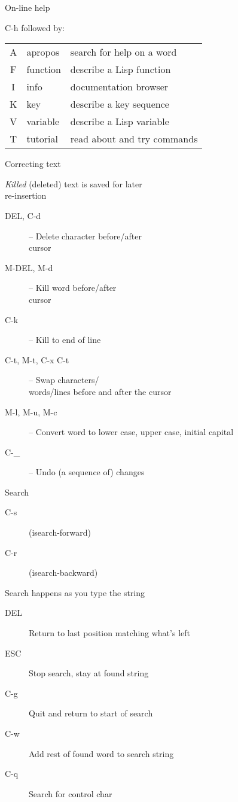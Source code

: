 \begin{slide}{}
On-line help

\vspace{3cm}

C-h followed by:

\begin{tabular}{cll}
A & apropos  & search for help on a word \\
F & function & describe a Lisp function \\
I & info     & documentation browser \\
K & key      & describe a key sequence \\
V & variable & describe a Lisp variable \\
T & tutorial & read about and try commands
\end{tabular}
\end{slide}

\begin{slide}{}
Correcting text

{\em Killed} (deleted) text is saved for later \\
re-insertion

\begin{description}
\item[DEL, C-d]
-- Delete character before/after \\
cursor
\item[M-DEL, M-d]
-- Kill word before/after \\
cursor
\item[C-k]
-- Kill to end of line

\item[C-t, M-t, C-x C-t]
-- Swap characters/ \\
words/lines before and after the cursor

\item[M-l, M-u, M-c]
-- Convert word to lower case, upper case, initial capital

\item[C-\_]
-- Undo (a sequence of) changes
\end{description}
\end{slide}

\begin{slide}{}
Search
\begin{description}
\item[C-s]
(isearch-forward)
\item[C-r]
(isearch-backward)
\end{description}
Search happens as you type the string

\begin{description}
\item[DEL]
Return to last position matching what's left
\item[ESC]
Stop search, stay at found string
\item[C-g]
Quit and return to start of search
\item[C-w]
Add rest of found word to search string
\item[C-q]
Search for control char
\end{description}
\end{slide}

